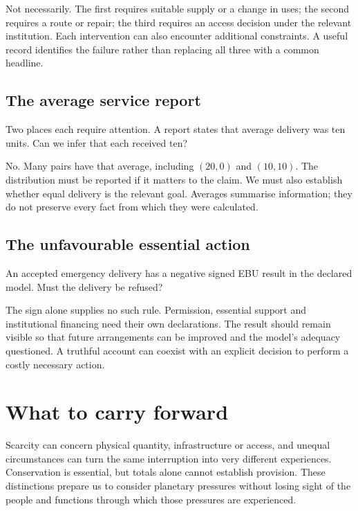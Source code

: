 Not necessarily. The first requires suitable supply or a change in uses; the second requires a route or repair; the third requires an access decision under the relevant institution. Each intervention can also encounter additional constraints. A useful record identifies the failure rather than replacing all three with a common headline.

\subsection{The average service report}
Two places each require attention. A report states that average delivery was ten units. Can we infer that each received ten?

No. Many pairs have that average, including $(20,0)$ and $(10,10)$. The distribution must be reported if it matters to the claim. We must also establish whether equal delivery is the relevant goal. Averages summarise information; they do not preserve every fact from which they were calculated.

\subsection{The unfavourable essential action}
An accepted emergency delivery has a negative signed EBU result in the declared model. Must the delivery be refused?

The sign alone supplies no such rule. Permission, essential support and institutional financing need their own declarations. The result should remain visible so that future arrangements can be improved and the model's adequacy questioned. A truthful account can coexist with an explicit decision to perform a costly necessary action.

\section{What to carry forward}
Scarcity can concern physical quantity, infrastructure or access, and unequal circumstances can turn the same interruption into very different experiences. Conservation is essential, but totals alone cannot establish provision. These distinctions prepare us to consider planetary pressures without losing sight of the people and functions through which those pressures are experienced.
